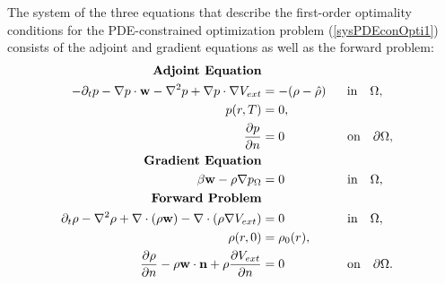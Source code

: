 The system of the three equations that describe the first-order optimality conditions for the PDE-constrained optimization problem (\ref{sysPDEconOpti1}) consists of the adjoint and gradient equations as well as the forward problem:
\begin{align}\label{sysFirstOderOptimality1}
\textbf{Adjoint Equation}  \\
 - \partial_t  p  - \nabla p \cdot \mathbf{w}  - \nabla^2 p 
+  \nabla p \cdot \nabla V_{ext} &=-(\rho- \hat{\rho})  \quad \ \  \text{in} \quad \Omega, \notag \\
p(r,T) &= 0, \notag\\
\frac{\partial p }{\partial n} &=0 \quad \quad \quad \quad\quad \text{on} \quad \partial\Omega, \notag\\
\textbf{Gradient Equation} \notag \\
 \beta \mathbf{w}  - \rho \nabla p_\Omega &=0 \quad  \quad \quad \quad \quad \text{in} \quad \Omega, \notag \\
\textbf{Forward Problem} \notag \\
\partial_t \rho - \nabla^2 \rho + \nabla \cdot (\rho \mathbf{w}) - \nabla \cdot (\rho \nabla V_{ext}) &=0 \quad \quad \quad \quad \quad\text{in} \quad \Omega, \notag \\ 
\rho(r,0)&=\rho_0(r), \notag \\
\dfrac{\partial \rho}{\partial n} - \rho \mathbf{w} \cdot \mathbf{n} + \rho \dfrac{\partial V_{ext}}{\partial n} &=0 \quad \quad \quad \quad \quad \text{on} \quad \partial \Omega. \notag
\end{align}
